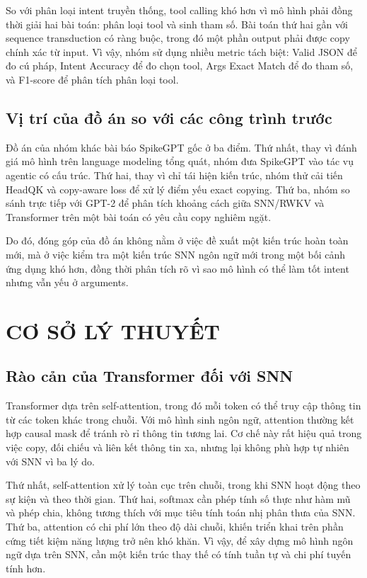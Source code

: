 \documentclass[12pt,a4paper,oneside]{report}
\newlength{\manualparindent}
\newcommand{\manualindent}{\hspace*{\manualparindent}}
\begin{document}
\manualindent%
So với phân loại intent truyền thống, tool calling khó hơn vì mô hình phải đồng thời giải hai bài toán: phân loại tool và sinh tham số. Bài toán thứ hai gần với sequence transduction có ràng buộc, trong đó một phần output phải được copy chính xác từ input. Vì vậy, nhóm sử dụng nhiều metric tách biệt: Valid JSON để đo cú pháp, Intent Accuracy để đo chọn tool, Args Exact Match để đo tham số, và F1-score để phân tích phân loại tool.

\section{Vị trí của đồ án so với các công trình trước}

\manualindent%
Đồ án của nhóm khác bài báo SpikeGPT gốc ở ba điểm. Thứ nhất, thay vì đánh giá mô hình trên language modeling tổng quát, nhóm đưa SpikeGPT vào tác vụ agentic có cấu trúc. Thứ hai, thay vì chỉ tái hiện kiến trúc, nhóm thử cải tiến HeadQK và copy-aware loss để xử lý điểm yếu exact copying. Thứ ba, nhóm so sánh trực tiếp với GPT-2 để phân tích khoảng cách giữa SNN/RWKV và Transformer trên một bài toán có yêu cầu copy nghiêm ngặt.

\manualindent%
Do đó, đóng góp của đồ án không nằm ở việc đề xuất một kiến trúc hoàn toàn mới, mà ở việc kiểm tra một kiến trúc SNN ngôn ngữ mới trong một bối cảnh ứng dụng khó hơn, đồng thời phân tích rõ vì sao mô hình có thể làm tốt intent nhưng vẫn yếu ở arguments.

\chapter{CƠ SỞ LÝ THUYẾT}

\section{Rào cản của Transformer đối với SNN}

\manualindent%
Transformer dựa trên self-attention, trong đó mỗi token có thể truy cập thông tin từ các token khác trong chuỗi. Với mô hình sinh ngôn ngữ, attention thường kết hợp causal mask để tránh rò rỉ thông tin tương lai. Cơ chế này rất hiệu quả trong việc copy, đối chiếu và liên kết thông tin xa, nhưng lại không phù hợp tự nhiên với SNN vì ba lý do.

\manualindent%
Thứ nhất, self-attention xử lý toàn cục trên chuỗi, trong khi SNN hoạt động theo sự kiện và theo thời gian. Thứ hai, softmax cần phép tính số thực như hàm mũ và phép chia, không tương thích với mục tiêu tính toán nhị phân thưa của SNN. Thứ ba, attention có chi phí lớn theo độ dài chuỗi, khiến triển khai trên phần cứng tiết kiệm năng lượng trở nên khó khăn. Vì vậy, để xây dựng mô hình ngôn ngữ dựa trên SNN, cần một kiến trúc thay thế có tính tuần tự và chi phí tuyến tính hơn.
\end{document}
